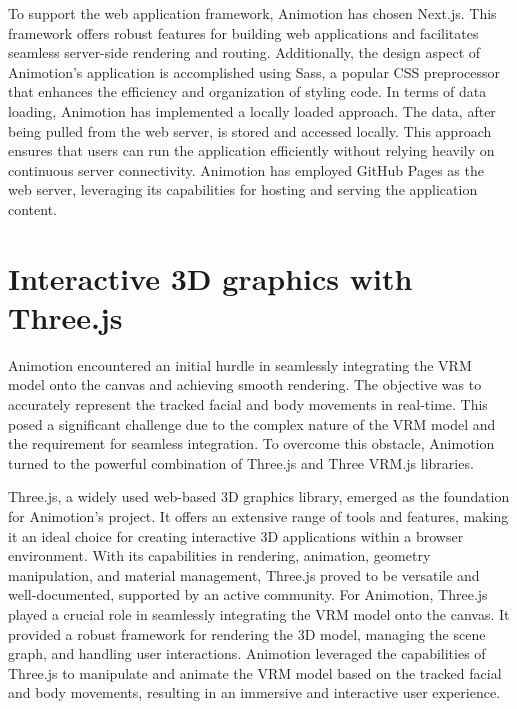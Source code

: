To support the web application framework, Animotion has chosen Next.js. 
This framework offers robust features for building web applications and facilitates seamless server-side 
rendering and routing. Additionally, the design aspect of Animotion's application is accomplished using Sass, 
a popular CSS preprocessor that enhances the efficiency and organization of styling code.
In terms of data loading, Animotion has implemented a locally loaded approach. The data, after being 
pulled from the web server, is stored and accessed locally. This approach ensures that users can run the 
application efficiently without relying heavily on continuous server connectivity. Animotion has employed 
GitHub Pages as the web server, leveraging its capabilities for hosting and serving the application content.

\section{Interactive 3D graphics with Three.js}
Animotion encountered an initial hurdle in seamlessly integrating the VRM model onto the canvas 
and achieving smooth rendering. The objective was to accurately represent the tracked facial and 
body movements in real-time. This posed a significant challenge due to the complex nature of the VRM 
model and the requirement for seamless integration. To overcome this obstacle, Animotion turned to the 
powerful combination of Three.js and Three VRM.js libraries.

Three.js, a widely used web-based 3D graphics library, emerged as the foundation for 
Animotion's project. It offers an extensive range of tools and features, making it an ideal 
choice for creating interactive 3D applications within a browser environment. With its capabilities 
in rendering, animation, geometry manipulation, and material management, Three.js proved to be 
versatile and well-documented, supported by an active community.
For Animotion, Three.js played a crucial role in seamlessly integrating the VRM model onto 
the canvas. It provided a robust framework for rendering the 3D model, managing the scene graph, 
and handling user interactions. Animotion leveraged the capabilities of Three.js to manipulate and 
animate the VRM model based on the tracked facial and body movements, resulting in an immersive and interactive user experience. \cite{threejs}


